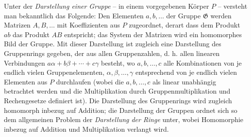 Unter der \emph{Darstellung einer Gruppe} -- in einem vorgegebenen Körper $P$ -- versteht man bekanntlich das Folgende: Den Elementen $a,b,\ldots$ der Gruppe $\mathfrak{G}$ werden Matrizen $A,B,\ldots$ mit Koeffizienten aus $P$ zugeordnet, derart dass dem Produkt $ab$ das Produkt $AB$ entspricht; das System der Matrizen wird ein homomorphes Bild der Gruppe. Mit dieser Darstellung ist zugleich eine Darstellung des \guillemotleft Gruppenrings\guillemotright{} gegeben, der aus allen \guillemotleft Gruppenzahlen\guillemotright, d. h. allen linearen Verbindungen $a\alpha+b\beta+\cdots+c\gamma$ besteht, wo $a,b,\ldots,c$ alle Kombinationen von je endlich vielen Gruppenelementen, $\alpha,\beta,\ldots,\gamma$ entsprechend von je endlich vielen Elementen aus $P$ durchlaufen (wobei die $a,b,\ldots,c$ als linear unabhängig betrachtet werden und die Multiplikation durch Gruppenmultiplikation und Rechengesetze definiert ist). Die Darstellung des Gruppenrings wird zugleich homomorph inbezug auf Addition; die Darstellung der Gruppen ordnet sich so dem allgemeinen Problem der \emph{Darstellung der Ringe} unter, wobei Homomorphie inbezug auf Addition und Multiplikation verlangt wird.
